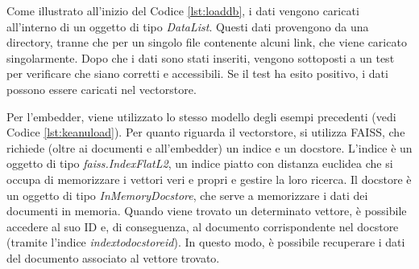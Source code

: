 Come illustrato all'inizio del Codice \ref{lst:loaddb}, i dati vengono caricati all'interno di un oggetto di tipo \textit{DataList}. Questi dati provengono da una directory, tranne che per un singolo file contenente alcuni link, che viene caricato singolarmente. Dopo che i dati sono stati inseriti, vengono sottoposti a un test per verificare che siano corretti e accessibili. Se il test ha esito positivo, i dati possono essere caricati nel vectorstore.

Per l'embedder, viene utilizzato lo stesso modello degli esempi precedenti (vedi Codice \ref{lst:keanuload}). Per quanto riguarda il vectorstore, si utilizza FAISS, che richiede (oltre ai documenti e all'embedder) un indice e un docstore. L'indice è un oggetto di tipo \textit{faiss.IndexFlatL2}, un indice piatto con distanza euclidea che si occupa di memorizzare i vettori veri e propri e gestire la loro ricerca. Il docstore è un oggetto di tipo \textit{InMemoryDocstore}, che serve a memorizzare i dati dei documenti in memoria. Quando viene trovato un determinato vettore, è possibile accedere al suo ID e, di conseguenza, al documento corrispondente nel docstore  (tramite l'indice \textit{index\textunderscore to\textunderscore docstore\textunderscore id}). In questo modo, è possibile recuperare i dati del documento associato al vettore trovato.